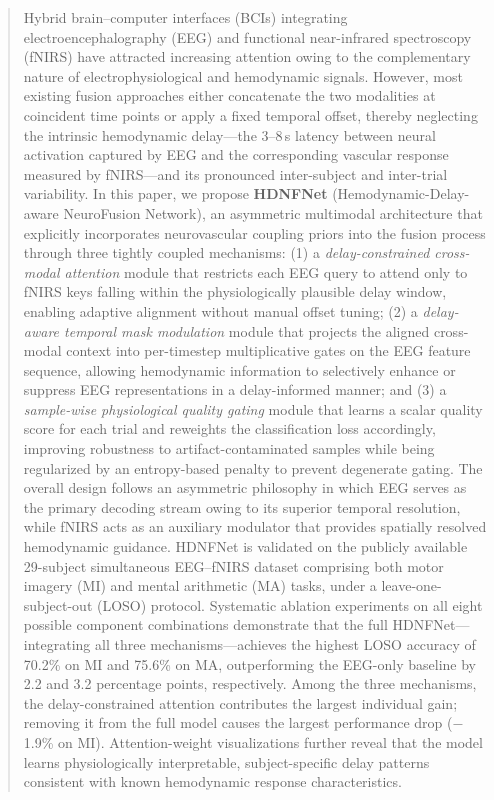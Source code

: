 \documentclass[preprint,12pt,authoryear]{elsarticle}
\begin{document}
\begin{frontmatter}
\begin{abstract}
Hybrid brain--computer interfaces (BCIs) integrating electroencephalography (EEG) and functional near-infrared spectroscopy (fNIRS) have attracted increasing attention owing to the complementary nature of electrophysiological and hemodynamic signals. However, most existing fusion approaches either concatenate the two modalities at coincident time points or apply a fixed temporal offset, thereby neglecting the intrinsic hemodynamic delay---the 3--8\,s latency between neural activation captured by EEG and the corresponding vascular response measured by fNIRS---and its pronounced inter-subject and inter-trial variability. In this paper, we propose \textbf{HDNFNet} (Hemodynamic-Delay-aware NeuroFusion Network), an asymmetric multimodal architecture that explicitly incorporates neurovascular coupling priors into the fusion process through three tightly coupled mechanisms: (1) a \textit{delay-constrained cross-modal attention} module that restricts each EEG query to attend only to fNIRS keys falling within the physiologically plausible delay window, enabling adaptive alignment without manual offset tuning; (2) a \textit{delay-aware temporal mask modulation} module that projects the aligned cross-modal context into per-timestep multiplicative gates on the EEG feature sequence, allowing hemodynamic information to selectively enhance or suppress EEG representations in a delay-informed manner; and (3) a \textit{sample-wise physiological quality gating} module that learns a scalar quality score for each trial and reweights the classification loss accordingly, improving robustness to artifact-contaminated samples while being regularized by an entropy-based penalty to prevent degenerate gating. The overall design follows an asymmetric philosophy in which EEG serves as the primary decoding stream owing to its superior temporal resolution, while fNIRS acts as an auxiliary modulator that provides spatially resolved hemodynamic guidance. HDNFNet is validated on the publicly available 29-subject simultaneous EEG--fNIRS dataset comprising both motor imagery (MI) and mental arithmetic (MA) tasks, under a leave-one-subject-out (LOSO) protocol. Systematic ablation experiments on all eight possible component combinations demonstrate that the full HDNFNet---integrating all three mechanisms---achieves the highest LOSO accuracy of 70.2\% on MI and 75.6\% on MA, outperforming the EEG-only baseline by 2.2 and 3.2 percentage points, respectively. Among the three mechanisms, the delay-constrained attention contributes the largest individual gain; removing it from the full model causes the largest performance drop ($-$1.9\% on MI). Attention-weight visualizations further reveal that the model learns physiologically interpretable, subject-specific delay patterns consistent with known hemodynamic response characteristics.
\end{abstract}


\end{frontmatter}
\end{document}
